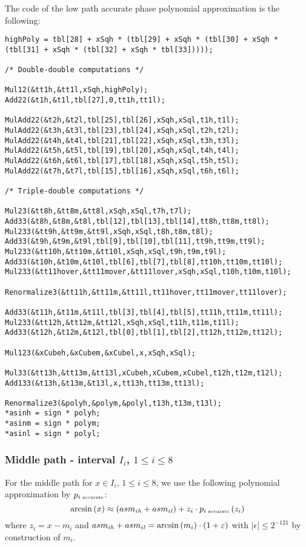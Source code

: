 The code of the low path accurate phase polynomial approximation is
the following:
\begin{lstlisting}[caption={Low path accurate phase polynomial approximation},firstnumber=1]
highPoly = tbl[28] + xSqh * (tbl[29] + xSqh * (tbl[30] + xSqh * (tbl[31] + xSqh * (tbl[32] + xSqh * tbl[33]))));

/* Double-double computations */

Mul12(&tt1h,&tt1l,xSqh,highPoly);
Add22(&t1h,&t1l,tbl[27],0,tt1h,tt1l);

MulAdd22(&t2h,&t2l,tbl[25],tbl[26],xSqh,xSql,t1h,t1l);
MulAdd22(&t3h,&t3l,tbl[23],tbl[24],xSqh,xSql,t2h,t2l);
MulAdd22(&t4h,&t4l,tbl[21],tbl[22],xSqh,xSql,t3h,t3l);
MulAdd22(&t5h,&t5l,tbl[19],tbl[20],xSqh,xSql,t4h,t4l);
MulAdd22(&t6h,&t6l,tbl[17],tbl[18],xSqh,xSql,t5h,t5l);
MulAdd22(&t7h,&t7l,tbl[15],tbl[16],xSqh,xSql,t6h,t6l);

/* Triple-double computations */

Mul23(&tt8h,&tt8m,&tt8l,xSqh,xSql,t7h,t7l);                            
Add33(&t8h,&t8m,&t8l,tbl[12],tbl[13],tbl[14],tt8h,tt8m,tt8l);          
Mul233(&tt9h,&tt9m,&tt9l,xSqh,xSql,t8h,t8m,t8l);                       
Add33(&t9h,&t9m,&t9l,tbl[9],tbl[10],tbl[11],tt9h,tt9m,tt9l);           
Mul233(&tt10h,&tt10m,&tt10l,xSqh,xSql,t9h,t9m,t9l);                    
Add33(&t10h,&t10m,&t10l,tbl[6],tbl[7],tbl[8],tt10h,tt10m,tt10l);       
Mul233(&tt11hover,&tt11mover,&tt11lover,xSqh,xSql,t10h,t10m,t10l);     

Renormalize3(&tt11h,&tt11m,&tt11l,tt11hover,tt11mover,tt11lover);      

Add33(&t11h,&t11m,&t11l,tbl[3],tbl[4],tbl[5],tt11h,tt11m,tt11l);       
Mul233(&tt12h,&tt12m,&tt12l,xSqh,xSql,t11h,t11m,t11l);                 
Add33(&t12h,&t12m,&t12l,tbl[0],tbl[1],tbl[2],tt12h,tt12m,tt12l);       

Mul123(&xCubeh,&xCubem,&xCubel,x,xSqh,xSql);                           

Mul33(&tt13h,&tt13m,&tt13l,xCubeh,xCubem,xCubel,t12h,t12m,t12l);       
Add133(&t13h,&t13m,&t13l,x,tt13h,tt13m,tt13l);                         

Renormalize3(&polyh,&polym,&polyl,t13h,t13m,t13l);                     
*asinh = sign * polyh;
*asinm = sign * polym;
*asinl = sign * polyl;
\end{lstlisting} 

\subsubsection{Middle path - interval $I_i$, $1 \leq i \leq 8$}
For the middle path for $x \in I_i$, $1 \leq i \leq 8$, we use the
following polynomial approximation by $p_{i \mbox{\tiny ~accurate}}$:
$$\arcsin\left( x \right) \approx \left( asm_{i\mathit{h}} + asm_{i\mathit{l}} \right) + 
z_i \cdot p_{i \mbox{\tiny ~accurate}}\left( z_i\right)$$ where $z_i =
x - m_i$ and $asm_{i\mathit{h}} + asm_{i\mathit{l}} = \arcsin\left( m_i \right)
\cdot \left( 1 + \varepsilon \right)$ with $\left \vert \epsilon \right
\vert \leq 2^{-121}$ by construction of $m_i$. 

